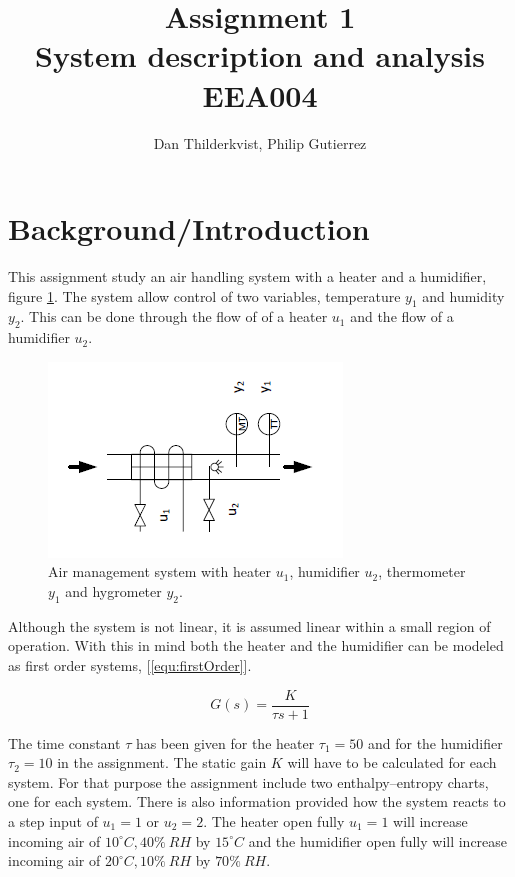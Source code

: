 \documentclass[a4paper, titlepage]{article}
\title{Assignment 1\\
System description and analysis\\
\large EEA004}
\author{Dan Thilderkvist, Philip Gutierrez}
\begin{document}
\maketitle

\section{Background/Introduction}
This assignment study an air handling system with a heater and a humidifier, figure \ref{fig:airSystem}.
The system allow control of two variables, temperature $y_1$ and humidity $y_2$.
This can be done through the flow of of a heater $u_1$ and the flow of a humidifier $u_2$.

\begin{figure}
\center
\includegraphics[scale=1]{../figures/heaterHumidifier.png}
\caption{Air management system with heater $u_1$, humidifier $u_2$, thermometer $y_1$ and hygrometer $y_2$.}
\label{fig:airSystem}
\end{figure}

Although the system is not linear, it is assumed linear within a small region of operation.
With this in mind both the heater and the humidifier can be modeled as first order systems, [\ref{equ:firstOrder}].

\begin{equation}
G(s) = \frac{K}{\tau s + 1}
\label{equ:firstOrder}
\end{equation}

The time constant $\tau$ has been given for the heater $\tau_1=50$ and for the humidifier $\tau_2=10$ in the assignment.
The static gain $K$ will have to be calculated for each system.
For that purpose the assignment include two enthalpy–entropy charts, one for each system.
There is also information provided how the system reacts to a step input of $u_1 = 1$ or $u_2 = 2$.
The heater open fully $u_1 = 1$ will increase incoming air of $10^\circ C, 40\% \: RH$ by $15^\circ C$ and the humidifier open fully will increase incoming air of $20^\circ C, 10\% \: RH$ by $70\% \: RH$.
\end{document}
